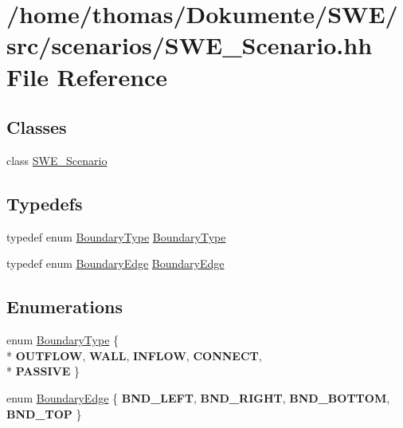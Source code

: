 \hypertarget{SWE__Scenario_8hh}{\section{/home/thomas/\-Dokumente/\-S\-W\-E/src/scenarios/\-S\-W\-E\-\_\-\-Scenario.hh File Reference}
\label{SWE__Scenario_8hh}
}
\subsection*{Classes}
\begin{DoxyCompactItemize}
\item 
class \hyperlink{classSWE__Scenario}{S\-W\-E\-\_\-\-Scenario}
\end{DoxyCompactItemize}
\subsection*{Typedefs}
\begin{DoxyCompactItemize}
\item 
typedef enum \hyperlink{SWE__Scenario_8hh_af75d5dd7322fa39ed0af4e7839e600f8}{Boundary\-Type} \hyperlink{SWE__Scenario_8hh_a0076a482278ddc13ed179c6c76c9b5ad}{Boundary\-Type}
\item 
typedef enum \hyperlink{SWE__Scenario_8hh_aa5e01e3f7df312f7b9b0d02521141fcc}{Boundary\-Edge} \hyperlink{SWE__Scenario_8hh_a53b43e70a19e542b4c1ab2da9c6bcc0e}{Boundary\-Edge}
\end{DoxyCompactItemize}
\subsection*{Enumerations}
\begin{DoxyCompactItemize}
\item 
enum \hyperlink{SWE__Scenario_8hh_af75d5dd7322fa39ed0af4e7839e600f8}{Boundary\-Type} \{ \\*
{\bfseries O\-U\-T\-F\-L\-O\-W}, 
{\bfseries W\-A\-L\-L}, 
{\bfseries I\-N\-F\-L\-O\-W}, 
{\bfseries C\-O\-N\-N\-E\-C\-T}, 
\\*
{\bfseries P\-A\-S\-S\-I\-V\-E}
 \}
\item 
enum \hyperlink{SWE__Scenario_8hh_aa5e01e3f7df312f7b9b0d02521141fcc}{Boundary\-Edge} \{ {\bfseries B\-N\-D\-\_\-\-L\-E\-F\-T}, 
{\bfseries B\-N\-D\-\_\-\-R\-I\-G\-H\-T}, 
{\bfseries B\-N\-D\-\_\-\-B\-O\-T\-T\-O\-M}, 
{\bfseries B\-N\-D\-\_\-\-T\-O\-P}
 \}
\end{DoxyCompactItemize}


